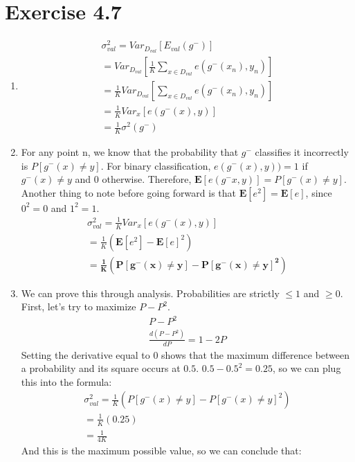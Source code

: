 \documentclass[12pt]{article}
\begin{document}
\section*{Exercise 4.7}
\begin{enumerate}[label=(\alph*)]
	\item
	\begin{gather*}
		\sigma^2_{val} = Var_{D_{val}}[E_{val}(g^-)]
		\\ = Var_{D_{val}}[\frac{1}{K}\sum_{x\in D_{val}} e(g^-(x_n), y_n)]
		\\ = \frac{1}{K} Var_{D_{val}}[\sum_{x\in D_{val}} e(g^-(x_n), y_n)]
		\\ = \frac{1}{K} Var_{x}[e(g^-(x), y)]
		\\ = \frac{1}{K} \sigma^2(g^-)
	\end{gather*}
	\item For any point n, we know that the probability that $g^-$ classifies it incorrectly is $P[g^-(x) \neq y]$. For binary classification, $e(g^-(x), y)) = 1$ if $g^-(x) \neq y$ and 0 otherwise. Therefore, $\mathbf{E}[e(g^-x, y)] = P[g^-(x) \neq y]$. Another thing to note before going forward is that $\mathbf{E}[e^2] = \mathbf{E}[e]$, since $0^2 = 0$ and $1^2 = 1$.
	\begin{gather*}
		\sigma^2_{val} = \frac{1}{K} Var_{x}[e(g^-(x), y)]
		\\ = \frac{1}{K} (\mathbf{E}[e^2] - \mathbf{E}[e]^2)
		\\ = \boldsymbol{\frac{1}{K} (P[g^-(x) \neq y] - P[g^-(x) \neq y]^2)}
	\end{gather*}
	\item We can prove this through analysis. Probabilities are strictly $\le 1$ and $\ge 0$. First, let's try to maximize $P - P^2$.
	\begin{gather*}
		P - P^2
		\\ \frac{d(P - P^2)}{dP} = 1 - 2P
	\end{gather*}
	Setting the derivative equal to 0 shows that the maximum difference between a probability and its square occurs at $0.5$. $0.5 - 0.5^2 = 0.25$, so we can plug this into the formula:
	\begin{gather*}
		\sigma^2_{val} = \frac{1}{K} (P[g^-(x) \neq y] - P[g^-(x) \neq y]^2)
		\\ = \frac{1}{K} (0.25)
		\\ = \frac{1}{4K}
	\end{gather*}
	And this is the maximum possible value, so we can conclude that:
	\begin{gather*}

\end{gather*}
\end{enumerate}
\end{document}
